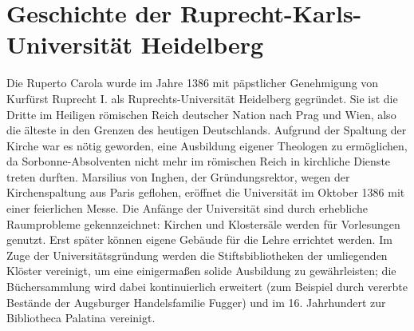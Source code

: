 \section{Geschichte der Ruprecht-Karls-Universität Heidelberg}
\label{geschichte}
Die Ruperto Carola wurde im Jahre 1386 mit päpstlicher Genehmigung von Kurfürst 
Ruprecht I. als Ruprechts-Universität Heidelberg gegründet. Sie ist die Dritte im 
Heiligen römischen Reich deutscher Nation nach Prag und Wien, also die älteste in 
den Grenzen des heutigen Deutschlands. Aufgrund der Spaltung der Kirche war es 
nötig geworden, eine Ausbildung eigener Theologen zu ermöglichen, da 
Sorbonne-Absolventen nicht mehr im römischen Reich in kirchliche Dienste treten durften.
Marsilius von Inghen, der Gründungsrektor, wegen der Kirchenspaltung aus Paris geflohen, eröffnet die Universität im Oktober 1386 mit einer feierlichen Messe. Die Anfänge 
der Universität sind durch erhebliche Raumprobleme gekennzeichnet: Kirchen und 
Klostersäle werden für Vorlesungen genutzt. Erst später können eigene Gebäude für 
die Lehre errichtet werden. Im Zuge der Universitätsgründung werden die 
Stiftsbibliotheken der umliegenden Klöster vereinigt, um eine einigermaßen solide 
Ausbildung zu gewährleisten; die Büchersammlung wird dabei kontinuierlich erweitert 
(zum Beispiel durch vererbte Bestände der Augsburger Handelsfamilie Fugger) und im 
16. Jahrhundert zur Bibliotheca Palatina vereinigt.

